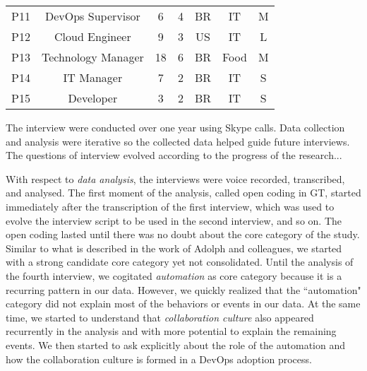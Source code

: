 \begin{table}[t]
\begin{tabular}{ccccccc}
P11                  & DevOps Supervisor                & 6            & 4           & BR            & IT                  & M                               \\

P12                  & Cloud Engineer              & 9            & 3           & US            & IT                  & L                               \\

P13                  & Technology Manager                 & 18            & 6           & BR            & Food                  & M                               \\

P14                  & IT Manager            & 7            & 2           & BR            & IT                  & S                               \\

P15                  & Developer        & 3            & 2           & BR            & IT                  & S
\end{tabular}
\end{table}



The interview were conducted over one year using Skype calls.
Data collection and analysis were iterative so the collected data helped guide
future interviews. {\color{red}The questions of interview evolved according to the progress
of the research...}

With respect to \emph{data analysis}, the interviews were voice recorded, transcribed, and analysed. The first moment
of the analysis, called open coding in GT, started immediately after the
transcription of the first interview, which
was used to evolve the interview script to be used in
the second interview, and so on. The open coding lasted until there was no
doubt about the core category of the study. Similar to what is described in
the work of Adolph and colleagues\cite{adolph2012reconciling}, we started
with a strong candidate core category yet not consolidated. Until
the analysis of the fourth interview, we cogitated \emph{automation} as core
category because it is a recurring pattern in our data. However, we quickly
realized that the ``automation" category did not explain most of the behaviors
or events in our data. At the same time, we started to understand that
\emph{collaboration culture} also appeared recurrently in the analysis and with more
potential to explain the remaining events. We then started to ask explicitly
about the role of the automation and how the collaboration culture is formed
in a DevOps adoption process.

